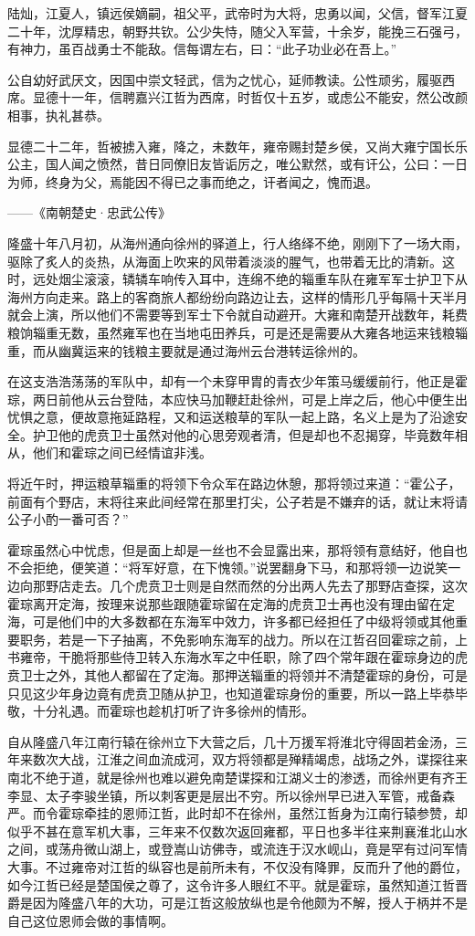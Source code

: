 陆灿，江夏人，镇远侯嫡嗣，祖父平，武帝时为大将，忠勇以闻，父信，督军江夏二十年，沈厚精忠，朝野共钦。公少失恃，随父入军营，十余岁，能挽三石强弓，有神力，虽百战勇士不能敌。信每谓左右，曰：“此子功业必在吾上。”

公自幼好武厌文，因国中崇文轻武，信为之忧心，延师教读。公性顽劣，履驱西席。显德十一年，信聘嘉兴江哲为西席，时哲仅十五岁，或虑公不能安，然公改颜相事，执礼甚恭。

显德二十二年，哲被掳入雍，降之，未数年，雍帝赐封楚乡侯，又尚大雍宁国长乐公主，国人闻之愤然，昔日同僚旧友皆诟厉之，唯公默然，或有讦公，公曰：一日为师，终身为父，焉能因不得已之事而绝之，讦者闻之，愧而退。

——《南朝楚史·忠武公传》

隆盛十年八月初，从海州通向徐州的驿道上，行人络绎不绝，刚刚下了一场大雨，驱除了炙人的炎热，从海面上吹来的风带着淡淡的腥气，也带着无比的清新。这时，远处烟尘滚滚，辚辚车响传入耳中，连绵不绝的辎重车队在雍军军士护卫下从海州方向走来。路上的客商旅人都纷纷向路边让去，这样的情形几乎每隔十天半月就会上演，所以他们不需要等到军士下令就自动避开。大雍和南楚开战数年，耗费粮饷辎重无数，虽然雍军也在当地屯田养兵，可是还是需要从大雍各地运来钱粮辎重，而从幽冀运来的钱粮主要就是通过海州云台港转运徐州的。

在这支浩浩荡荡的军队中，却有一个未穿甲胄的青衣少年策马缓缓前行，他正是霍琮，两日前他从云台登陆，本应快马加鞭赶赴徐州，可是上岸之后，他心中便生出忧惧之意，便故意拖延路程，又和运送粮草的军队一起上路，名义上是为了沿途安全。护卫他的虎贲卫士虽然对他的心思旁观者清，但是却也不忍揭穿，毕竟数年相从，他们和霍琮之间已经情谊非浅。

将近午时，押运粮草辎重的将领下令众军在路边休憩，那将领过来道：“霍公子，前面有个野店，末将往来此间经常在那里打尖，公子若是不嫌弃的话，就让末将请公子小酌一番可否？”

霍琮虽然心中忧虑，但是面上却是一丝也不会显露出来，那将领有意结好，他自也不会拒绝，便笑道：“将军好意，在下愧领。”说罢翻身下马，和那将领一边说笑一边向那野店走去。几个虎贲卫士则是自然而然的分出两人先去了那野店查探，这次霍琮离开定海，按理来说那些跟随霍琮留在定海的虎贲卫士再也没有理由留在定海，可是他们中的大多数都在东海军中效力，许多都已经担任了中级将领或其他重要职务，若是一下子抽离，不免影响东海军的战力。所以在江哲召回霍琮之前，上书雍帝，干脆将那些侍卫转入东海水军之中任职，除了四个常年跟在霍琮身边的虎贲卫士之外，其他人都留在了定海。那押送辎重的将领并不清楚霍琮的身份，可是只见这少年身边竟有虎贲卫随从护卫，也知道霍琮身份的重要，所以一路上毕恭毕敬，十分礼遇。而霍琮也趁机打听了许多徐州的情形。

自从隆盛八年江南行辕在徐州立下大营之后，几十万援军将淮北守得固若金汤，三年来数次大战，江淮之间血流成河，双方将领都是殚精竭虑，战场之外，谍探往来南北不绝于道，就是徐州也难以避免南楚谍探和江湖义士的渗透，而徐州更有齐王李显、太子李骏坐镇，所以刺客更是层出不穷。所以徐州早已进入军管，戒备森严。而令霍琮牵挂的恩师江哲，此时却不在徐州，虽然江哲身为江南行辕参赞，却似乎不甚在意军机大事，三年来不仅数次返回雍都，平日也多半往来荆襄淮北山水之间，或荡舟微山湖上，或登嵩山访佛寺，或流连于汉水岘山，竟是罕有过问军情大事。不过雍帝对江哲的纵容也是前所未有，不仅没有降罪，反而升了他的爵位，如今江哲已经是楚国侯之尊了，这令许多人眼红不平。就是霍琮，虽然知道江哲晋爵是因为隆盛八年的大功，可是江哲这般放纵也是令他颇为不解，授人于柄并不是自己这位恩师会做的事情啊。

